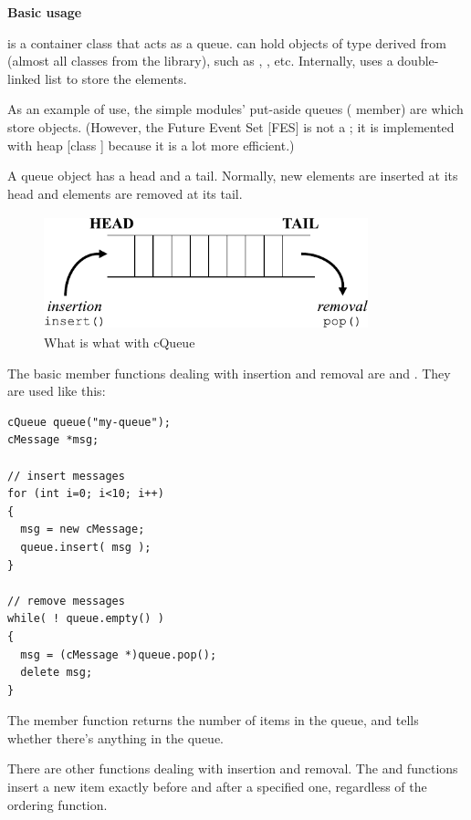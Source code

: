 \textbf{Basic usage}


 is a container class that acts as a queue.
 can hold objects of type derived from 
(almost all classes from the {\opp} library), such as
, , etc. Internally, 
uses a double-linked list to store the elements.

As an example of use, the simple modules'
put-aside queues ( member) are 
which store  objects. (However, the Future Event Set
[FES] is not a ; it is implemented with heap
[class ] because it is a lot more efficient.)

A queue object has a head and a tail. Normally, new elements 
are inserted at its head and elements are removed at its tail. 


\begin{figure}[htbp]
  \begin{center}
    \includegraphics[width=3.703in, height=1.303in]{figures/usmanFig10}
    \caption{What is what with cQueue}
    \label{fig:ch-sim-lib:cqueue}
  \end{center}
\end{figure}

The basic  member functions dealing with insertion and removal
are  and . They are used
like this:

\begin{Verbatim}
cQueue queue("my-queue");
cMessage *msg;

// insert messages
for (int i=0; i<10; i++)
{ 
  msg = new cMessage;
  queue.insert( msg );
}

// remove messages
while( ! queue.empty() )
{ 
  msg = (cMessage *)queue.pop();
  delete msg;
}
\end{Verbatim}


The  member function returns the number of items in the 
queue, and  tells whether there's anything in the queue.

There are other functions dealing with insertion and removal.  The
 and  functions insert a
new item exactly before and after a specified one, regardless of the
ordering function.

